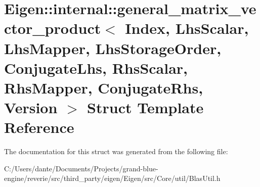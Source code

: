 \hypertarget{struct_eigen_1_1internal_1_1general__matrix__vector__product}{}\section{Eigen\+::internal\+::general\+\_\+matrix\+\_\+vector\+\_\+product$<$ Index, Lhs\+Scalar, Lhs\+Mapper, Lhs\+Storage\+Order, Conjugate\+Lhs, Rhs\+Scalar, Rhs\+Mapper, Conjugate\+Rhs, Version $>$ Struct Template Reference}
\label{struct_eigen_1_1internal_1_1general__matrix__vector__product}


The documentation for this struct was generated from the following file\+:\begin{DoxyCompactItemize}
\item 
C\+:/\+Users/dante/\+Documents/\+Projects/grand-\/blue-\/engine/reverie/src/third\+\_\+party/eigen/\+Eigen/src/\+Core/util/Blas\+Util.\+h\end{DoxyCompactItemize}
